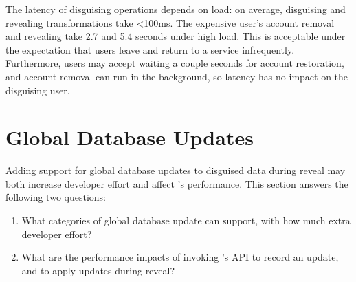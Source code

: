 %
%
%

The latency of disguising operations depends on load: on average, disguising and
revealing transformations take <100ms.  The expensive user's account removal and
revealing take 2.7 and 5.4 seconds under high load. 
%
%
%
This is acceptable under the expectation that users leave and
return to a service infrequently.  Furthermore, users may accept waiting a
couple seconds for account restoration, and account removal can run in the
background, so latency has no impact on the disguising user.  

\section{Global Database Updates}
\label{s:eval-updates}

%
Adding support for global database updates to disguised data during reveal may both
increase developer effort and affect \sys's performance.
This section answers the following two questions:
\begin{enumerate}[nosep]
    \item What categories of global database update can \sys support, with how
        much extra developer effort? 
    \item What are the performance impacts of invoking \sys's API to record an
        update, and to apply updates during reveal?
\end{enumerate}

